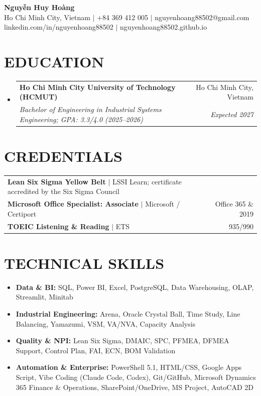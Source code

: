 \documentclass[a4paper,10pt]{article}
\makeatletter
\newcommand{\resumeSubheading}[4]{
  \vspace{-1pt}\item
  \begin{tabular*}{0.97\textwidth}[t]{l@{\extracolsep{\fill}}r}
    \textbf{#1} & #2 \\
    \textit{\small #3} & \textit{\small #4} \\
  \end{tabular*}\vspace{-6pt}
}
\newcommand{\resumeSubHeadingListStart}{\begin{itemize}[leftmargin=0.15in,label={},itemsep=0pt,topsep=2pt,parsep=0pt,partopsep=0pt]}
\newcommand{\resumeSubHeadingListEnd}{\end{itemize}}
\makeatother
\begin{document}
\begin{center}
  {\fontsize{22}{24}\selectfont\textbf{Nguyễn Huy Hoàng}} \\ \vspace{2pt}
  \small Ho Chi Minh City, Vietnam $|$ +84 369 412 005 $|$ nguyenhoang88502@gmail.com \\ \vspace{1pt}
  linkedin.com/in/nguyenhoang88502 $|$ nguyenhoang88502.github.io
\end{center}

\section{EDUCATION}
\resumeSubHeadingListStart
  \resumeSubheading
    {Ho Chi Minh City University of Technology (HCMUT)}{Ho Chi Minh City, Vietnam}
    {Bachelor of Engineering in Industrial Systems Engineering; GPA: 3.3/4.0 (2025--2026)}{Expected 2027}
\resumeSubHeadingListEnd

\section{CREDENTIALS}
\begin{tabularx}{\textwidth}{@{}Xr@{}}
  \small\textbf{Lean Six Sigma Yellow Belt} $|$ LSSI Learn; certificate accredited by the Six Sigma Council & \\
  \small\textbf{Microsoft Office Specialist: Associate} $|$ Microsoft / Certiport & \small Office 365 \& 2019 \\
  \small\textbf{TOEIC Listening \& Reading} $|$ ETS & \small 935/990
\end{tabularx}\vspace{-3pt}

\section{TECHNICAL SKILLS}
\begin{itemize}[leftmargin=0.15in,label={},itemsep=1pt,topsep=1pt]
  \small
  \item \textbf{Data \& BI:} SQL, Power BI, Excel, PostgreSQL, Data Warehousing, OLAP, Streamlit, Minitab
  \item \textbf{Industrial Engineering:} Arena, Oracle Crystal Ball, Time Study, Line Balancing, Yamazumi, VSM, VA/NVA, Capacity Analysis
  \item \textbf{Quality \& NPI:} Lean Six Sigma, DMAIC, SPC, PFMEA, DFMEA Support, Control Plan, FAI, ECN, BOM Validation
  \item \textbf{Automation \& Enterprise:} PowerShell 5.1, HTML/CSS, Google Apps Script, Vibe Coding (Claude Code, Codex), Git/GitHub, Microsoft Dynamics 365 Finance \& Operations, SharePoint/OneDrive, MS Project, AutoCAD 2D
\end{itemize}\vspace{-7pt}
\end{document}
